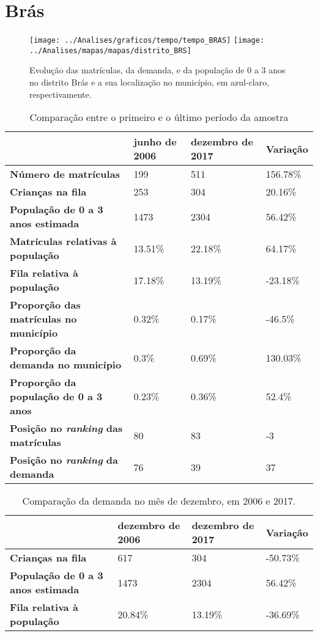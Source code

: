 \section{Brás}
\begin{figure}[H]
\centering
\texttt{[image: ../Analises/graficos/tempo/tempo\_BRAS]}
\texttt{[image: ../Analises/mapas/mapas/distrito\_BRS]}
\caption{Evolução das matrículas, da demanda, e da população de 0 a 3 anos no distrito Brás e a sua localização no município, em azul-claro, respectivamente.}
\end{figure}
\begin{table}[H]
\begin{tabular}{l|l|l|l}
\textbf{}                                      & \textbf{junho de 2006}       & \textbf{dezembro de 2017}    & \textbf{Variação} \\ \hline
\textbf{Número de matrículas}                  & 199 & 511 & 156.78\% \\ \hline
\textbf{Crianças na fila}                      & 253 & 304 & 20.16\% \\ \hline
\textbf{População de 0 a 3 anos estimada}      & 1473 & 2304 & 56.42\% \\ \hline
\textbf{Matrículas relativas à população}      & 13.51\% & 22.18\% & 64.17\% \\ \hline
\textbf{Fila relativa à população}             & 17.18\% & 13.19\% & -23.18\% \\ \hline
\textbf{Proporção das matrículas no município} & 0.32\% & 0.17\% & -46.5\% \\ \hline
\textbf{Proporção da demanda no município}     & 0.3\% & 0.69\% & 130.03\% \\ \hline
\textbf{Proporção da população de 0 a 3 anos}  & 0.23\% & 0.36\% & 52.4\% \\ \hline
\textbf{Posição no \textit{ranking} das matrículas}     & 80 & 83 & -3 \\ \hline
\textbf{Posição no \textit{ranking} da demanda}         & 76 & 39 & 37 \\ 
\end{tabular}
\caption{Comparação entre o primeiro e o último período da amostra}
\end{table}
\begin{table}[H]
\begin{tabular}{l|l|l|l}
\textbf{}                                 & \textbf{dezembro de 2006} & \textbf{dezembro de 2017} & \textbf{Variação} \\ \hline
\textbf{Crianças na fila}                      & 617 & 304 & -50.73\% \\ \hline
\textbf{População de 0 a 3 anos estimada}      & 1473 & 2304 & 56.42\% \\ \hline
\textbf{Fila relativa à população}             & 20.84\% & 13.19\% & -36.69\% \\
\end{tabular}
\caption{Comparação da demanda no mês de dezembro, em 2006 e 2017.}
\end{table}
